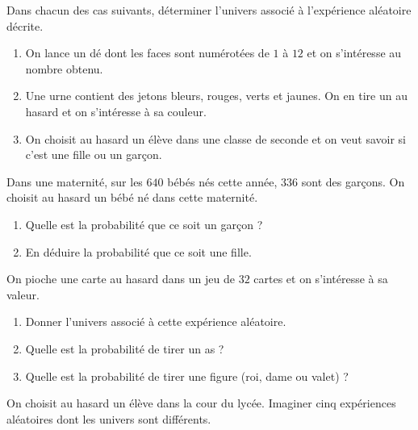 \documentclass[11pt]{article}
\begin{document}

\begin{exo}
  Dans chacun des cas suivants, déterminer l'univers associé à l'expérience
  aléatoire décrite.
  \begin{enumerate}
    \item On lance un dé dont les faces sont numérotées de $1$ à $12$ et on
      s'intéresse au nombre obtenu.
    \item Une urne contient des jetons bleurs, rouges, verts et jaunes. On en
      tire un au hasard et on s'intéresse à sa couleur.
    \item On choisit au hasard un élève dans une classe de seconde et on veut
      savoir si c'est une fille ou un garçon.
  \end{enumerate}
\end{exo}

\begin{exo}
  Dans une maternité, sur les $640$ bébés nés cette année, $336$ sont des
  garçons. On choisit au hasard un bébé né dans cette maternité.
  \begin{enumerate}
    \item Quelle est la probabilité que ce soit un garçon ?
    \item En déduire la probabilité que ce soit une fille.
  \end{enumerate}
\end{exo}

\begin{exo}
  On pioche une carte au hasard dans un jeu de $32$ cartes et on s'intéresse à
  sa valeur.
  \begin{enumerate}
    \item Donner l'univers associé à cette expérience aléatoire.
    \item Quelle est la probabilité de tirer un as ?
    \item Quelle est la probabilité de tirer une figure (roi, dame ou valet) ?
  \end{enumerate}
\end{exo}

\begin{exo}
  On choisit au hasard un élève dans la cour du lycée. Imaginer cinq
  expériences aléatoires dont les univers sont différents.
\end{exo}
\end{document}
